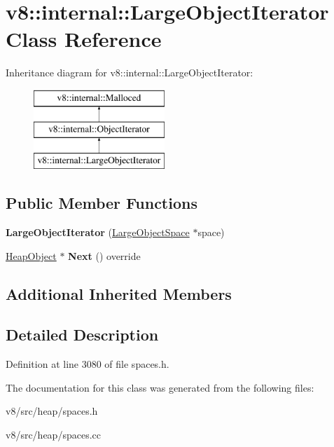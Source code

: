 \hypertarget{classv8_1_1internal_1_1LargeObjectIterator}{}\section{v8\+:\+:internal\+:\+:Large\+Object\+Iterator Class Reference}
\label{classv8_1_1internal_1_1LargeObjectIterator}
Inheritance diagram for v8\+:\+:internal\+:\+:Large\+Object\+Iterator\+:\begin{figure}[H]
\begin{center}
\leavevmode
\includegraphics[height=3.000000cm]{classv8_1_1internal_1_1LargeObjectIterator}
\end{center}
\end{figure}
\subsection*{Public Member Functions}
\begin{DoxyCompactItemize}
\item 
\mbox{\label{classv8_1_1internal_1_1LargeObjectIterator_ab14565d56a9d243c94e7d9b86f5862aa}} 
{\bfseries Large\+Object\+Iterator} (\mbox{\hyperlink{classv8_1_1internal_1_1LargeObjectSpace}{Large\+Object\+Space}} $\ast$space)
\item 
\mbox{\label{classv8_1_1internal_1_1LargeObjectIterator_a9da99e63aed10b569c83bbf514163ae9}} 
\mbox{\hyperlink{classv8_1_1internal_1_1HeapObject}{Heap\+Object}} $\ast$ {\bfseries Next} () override
\end{DoxyCompactItemize}
\subsection*{Additional Inherited Members}


\subsection{Detailed Description}


Definition at line 3080 of file spaces.\+h.



The documentation for this class was generated from the following files\+:\begin{DoxyCompactItemize}
\item 
v8/src/heap/spaces.\+h\item 
v8/src/heap/spaces.\+cc\end{DoxyCompactItemize}
